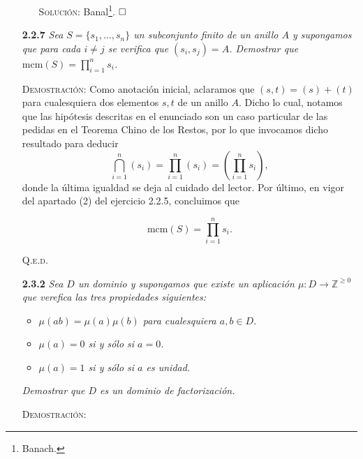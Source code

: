 \documentclass{article}
\newcommand{\mcm}{\text{mcm}}
\begin{document}
\begin{enumerate}
\begin{itemize}
        \vspace{7px}

        \textsc{Solución}: Banal\footnote{Banach.}. $\hfill\square$
    \end{itemize}

    \vspace{12px}

    \item[\textbf{2.2.7}] \textit{Sea $S = \{s_1, ..., s_n\}$ un subconjunto finito de un anillo $A$ y supongamos que para cada $i \neq j$ se verifica que $(s_i, s_j) = A$. Demostrar que $\mcm(S) = \prod_{i=1}^{n} s_i$.}

    \vspace{7px}

    \textsc{Demostración}: Como anotación inicial, aclaramos que $(s, t) = (s) + (t)$ para cualesquiera dos elementos $s, t$ de un anillo $A$. Dicho lo cual, notamos que las hipótesis descritas en el enunciado son un caso particular de las pedidas en el Teorema Chino de los Restos, por lo que invocamos dicho resultado para deducir \[\bigcap_{i = 1}^{n} (s_i) = \prod_{i=1}^{n} (s_i) = \left(\prod_{i=1}^{n} s_i\right),\] donde la última igualdad se deja al cuidado del lector. Por último, en vigor del apartado (2) del ejercicio 2.2.5, concluimos que 

    \[\mcm(S) = \prod_{i=1}^{n}s_i.\]

    \hfill{\textsc{Q.e.d.}}

    \vspace{12px}

    \item[\textbf{2.3.2}] \textit{Sea $D$ un dominio y supongamos que existe un aplicación $\mu : D \to \mathbb{Z}^{\geq 0}$ que verefica las tres propiedades siguientes:}

    \begin{itemize}
        \item \textit{$\mu(ab) = \mu(a)\mu(b)$ para cualesquiera $a, b \in D$.}
        
        \item \textit{$\mu(a) = 0$ si y sólo si $a = 0$.}

        \item \textit{$\mu(a) = 1$ si y sólo si $a$ es unidad.}
    \end{itemize}

    \textit{Demostrar que $D$ es un dominio de factorización.}

    \vspace{7px}

    \textsc{Demostración}: 
\end{enumerate}
\end{document}
